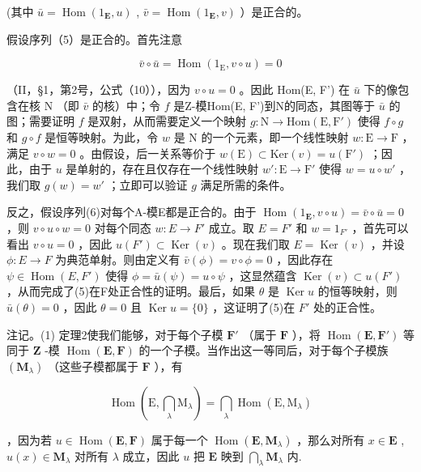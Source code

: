 (其中 \(\bar{u} = \operatorname{Hom}(1_{\mathbf{E}}, u)\) , \(\bar{v} = \operatorname{Hom}(1_{\mathbf{E}}, v)\) ）是正合的。

假设序列（5）是正合的。首先注意

\[
\bar {v} \circ \bar {u} = \operatorname{Hom} (1 _ {\mathrm{E}}, v \circ u) = 0
\]

（II，§1，第2号，公式（10）），因为 \(v \circ u = 0\) 。因此 Hom(E, F') 在 \(\bar{u}\) 下的像包含在核 N （即 \(\bar{v}\) 的核）中；令 \(f\) 是Z-模Hom(E, F')到N的同态，其图等于 \(\bar{u}\) 的图；需要证明 \(f\) 是双射，从而需要定义一个映射 \(g: \mathrm{N} \to \mathrm{Hom}(\mathrm{E}, \mathrm{F}')\) 使得 \(f \circ g\) 和 \(g \circ f\) 是恒等映射。为此，令 \(w\) 是 N 的一个元素，即一个线性映射 \(w: \mathrm{E} \to \mathrm{F}\) ，满足 \(v \circ w = 0\) 。由假设，后一关系等价于 \(w(\mathrm{E}) \subset \mathrm{Ker}(v) = u(\mathrm{F}')\) ；因此，由于 \(u\) 是单射的，存在且仅存在一个线性映射 \(w': \mathrm{E} \to \mathrm{F}'\) 使得 \(w = u \circ w'\) ，我们取 \(g(w) = w'\) ；立即可以验证 \(g\) 满足所需的条件。

反之，假设序列(6)对每个A-模E都是正合的。由于 \(\operatorname{Hom}(1_{\mathbf{E}}, v \circ u) = \bar{v} \circ \bar{u} = 0\) ，则 \(v \circ u \circ w = 0\) 对每个同态 \(w: E \to F'\) 成立。取 \(E = F'\) 和 \(w = 1_{F'}\) ，首先可以看出 \(v \circ u = 0\) ，因此 \(u(F') \subset \operatorname{Ker}(v)\) 。现在我们取 \(E = \operatorname{Ker}(v)\) ，并设 \(\phi: E \to F\) 为典范单射。则由定义有 \(\bar{v}(\phi) = v \circ \phi = 0\) ，因此存在 \(\psi \in \operatorname{Hom}(E, F')\) 使得 \(\phi = \bar{u}(\psi) = u \circ \psi\) ，这显然蕴含 \(\operatorname{Ker}(v) \subset u(F')\) ，从而完成了(5)在F处正合性的证明。最后，如果 \(\theta\) 是 \(\operatorname{Ker} u\) 的恒等映射，则 \(\bar{u}(\theta) = 0\) ，因此 \(\theta = 0\) 且 \(\operatorname{Ker} u = \{0\}\) ，这证明了(5)在 \(F'\) 处的正合性。

注记。(1) 定理2使我们能够，对于每个子模 \(\mathbf{F}'\) （属于 \(\mathbf{F}\) ），将 \(\operatorname{Hom}(\mathbf{E}, \mathbf{F}')\) 等同于 \(\mathbf{Z}\) -模 \(\operatorname{Hom}(\mathbf{E}, \mathbf{F})\) 的一个子模。当作出这一等同后，对于每个子模族 \((\mathbf{M}_{\lambda})\) （这些子模都属于 \(\mathbf{F}\) ），有

\[
\operatorname{Hom} \left(\mathrm{E}, \bigcap_ {\lambda} \mathrm{M} _ {\lambda}\right) = \bigcap_ {\lambda} \operatorname{Hom} (\mathrm{E}, \mathrm{M} _ {\lambda})
\]

，因为若 \(u \in \operatorname{Hom}(\mathbf{E}, \mathbf{F})\) 属于每一个 \(\operatorname{Hom}(\mathbf{E}, \mathbf{M}_{\lambda})\) ，那么对所有 \(x \in \mathbf{E}\) , \(u(x) \in \mathbf{M}_{\lambda}\) 对所有 \(\lambda\) 成立，因此 \(u\) 把 \(\mathbf{E}\) 映到 \(\bigcap_{\lambda} \mathbf{M}_{\lambda}\) 内.

